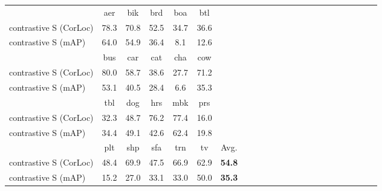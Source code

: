 \begin{center}
\begin{adjustbox}{max width=1.02\textwidth}
\begin{tabular}{l@{\hskip 0.5cm}c*{20}cc}
\toprule
&  aer & bik & brd & boa & btl \\
contrastive S (CorLoc) & 78.3 & 70.8 & 52.5 & 34.7 & 36.6 \\
contrastive S (mAP) & 64.0 & 54.9 & 36.4 & 8.1 & 12.6 \\
\midrule

& bus & car & cat & cha & cow \\
contrastive S (CorLoc) & 80.0 & 58.7 & 38.6 & 27.7 & 71.2 \\
contrastive S (mAP) &  53.1 & 40.5 & 28.4 & 6.6 & 35.3 \\

\midrule
& tbl & dog & hrs & mbk & prs \\
contrastive S (CorLoc) & 32.3 & 48.7 & 76.2 & 77.4 & 16.0 \\
contrastive S (mAP) & 34.4 & 49.1 & 42.6 & 62.4 & 19.8 \\

\midrule
& plt & shp & sfa & trn & tv & Avg. \\
contrastive S (CorLoc) & 48.4 & 69.9 & 47.5 & 66.9 & 62.9 & \textbf{54.8} \\
contrastive S (mAP) & 15.2 & 27.0 & 33.1 & 33.0 & 50.0 & \textbf{35.3}  \\
\bottomrule


\end{tabular}

\end{adjustbox}

\end{center}
